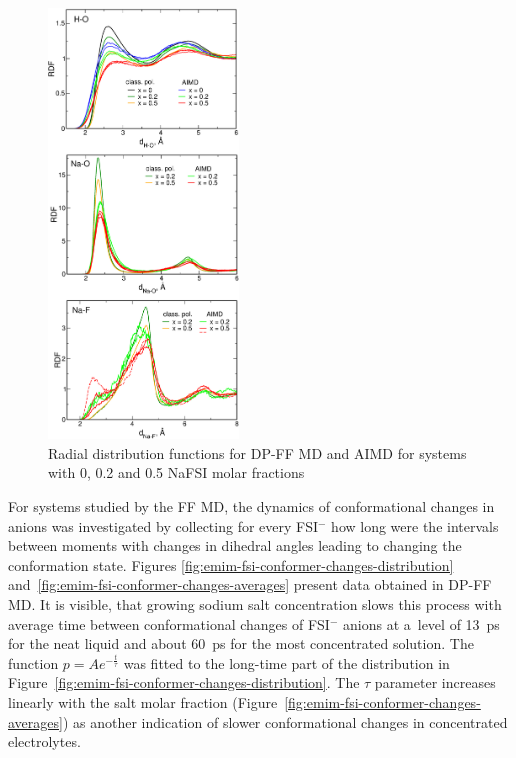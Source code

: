 \begin{figure}[ht]
    \centering
    \includegraphics[width=0.45\textwidth]{img/3-structural-data-from-md-simulations/1-emim-fsi/rdf/rdf.png}
    \caption{Radial distribution functions for DP-FF MD and AIMD for systems with 0, 0.2 and 0.5 NaFSI molar fractions}
    \label{fig:emim-fsi-rdf}
\end{figure}

For systems studied by the FF MD, the dynamics of conformational changes in anions was investigated by collecting for every FSI$^{-}$ how long were the intervals between moments with changes in dihedral angles leading to changing the conformation state. Figures \ref{fig:emim-fsi-conformer-changes-distribution} and~\ref{fig:emim-fsi-conformer-changes-averages} present data obtained in DP-FF MD. It is visible, that growing sodium salt concentration slows this process with average time between conformational changes of FSI$^{-}$ anions at a~level of 13~ps for the neat liquid and about 60~ps for the most concentrated solution. The function $p = Ae^{-\frac{t}{\tau}}$ was fitted to the long-time part of the distribution in Figure~\ref{fig:emim-fsi-conformer-changes-distribution}. The $\tau$ parameter increases linearly with the salt molar fraction (Figure~\ref{fig:emim-fsi-conformer-changes-averages}) as another indication of slower conformational changes in concentrated electrolytes.

